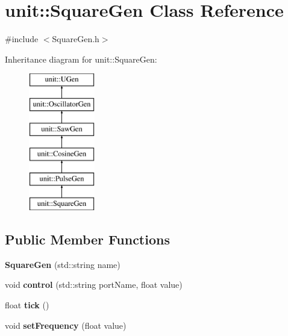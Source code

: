 \hypertarget{classunit_1_1SquareGen}{}\section{unit\+:\+:Square\+Gen Class Reference}
\label{classunit_1_1SquareGen}


{\ttfamily \#include $<$Square\+Gen.\+h$>$}

Inheritance diagram for unit\+:\+:Square\+Gen\+:\begin{figure}[H]
\begin{center}
\leavevmode
\includegraphics[height=6.000000cm]{classunit_1_1SquareGen}
\end{center}
\end{figure}
\subsection*{Public Member Functions}
\begin{DoxyCompactItemize}
\item 
{\bfseries Square\+Gen} (std\+::string name)\hypertarget{classunit_1_1SquareGen_a626505e8ade08b9383acda8901aa23b5}{}\label{classunit_1_1SquareGen_a626505e8ade08b9383acda8901aa23b5}

\item 
void {\bfseries control} (std\+::string port\+Name, float value)\hypertarget{classunit_1_1SquareGen_a8a25dc2b8c5d1ec7857e4da7ec96cecc}{}\label{classunit_1_1SquareGen_a8a25dc2b8c5d1ec7857e4da7ec96cecc}

\item 
float {\bfseries tick} ()\hypertarget{classunit_1_1SquareGen_a119ab47582ee5814687b87db6a71644c}{}\label{classunit_1_1SquareGen_a119ab47582ee5814687b87db6a71644c}

\item 
void {\bfseries set\+Frequency} (float value)\hypertarget{classunit_1_1SquareGen_a437dde2e640bc9267d937ae3058777de}{}\label{classunit_1_1SquareGen_a437dde2e640bc9267d937ae3058777de}

\end{DoxyCompactItemize}
